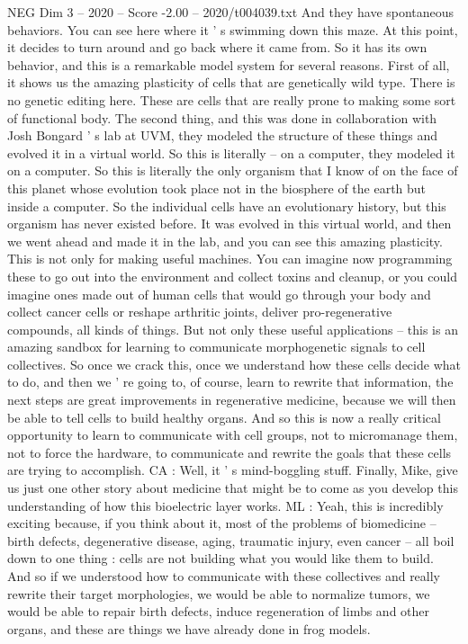 \begin{textsample}{NEG Dim 3 – 2020 – Score -2.00 – 2020/t004039.txt}
And they have spontaneous behaviors.
You can see here where it ' s swimming down this maze.
At this point, it decides to turn around and go back where it came from.
So it has its own behavior, and this is a remarkable model system for several reasons.
First of all, it shows us the amazing plasticity of cells that are genetically wild type.
There is no genetic editing here.
These are cells that are really prone to making some sort of functional body.
The second thing, and this was done in collaboration with Josh Bongard ' s lab at UVM, they modeled the structure of these things and evolved it in a virtual world.
So this is literally -- on a computer, they modeled it on a computer.
So this is literally the only organism that I know of on the face of this planet whose evolution took place not in the biosphere of the earth but inside a computer.
So the individual cells have an evolutionary history, but this organism has never existed before.
It was evolved in this virtual world, and then we went ahead and made it in the lab, and you can see this amazing plasticity.
This is not only for making useful machines.
You can imagine now programming these to go out into the environment and collect toxins and cleanup, or you could imagine ones made out of human cells that would go through your body and collect cancer cells or reshape arthritic joints, deliver pro-regenerative compounds, all kinds of things.
But not only these useful applications -- this is an amazing sandbox for learning to communicate morphogenetic signals to cell collectives.
So once we crack this, once we understand how these cells decide what to do, and then we ' re going to, of course, learn to rewrite that information, the next steps are great improvements in regenerative medicine, because we will then be able to tell cells to build healthy organs.
And so this is now a really critical opportunity to learn to communicate with cell groups, not to micromanage them, not to force the hardware, to communicate and rewrite the goals that these cells are trying to accomplish.
CA : Well, it ' s mind-boggling stuff.
Finally, Mike, give us just one other story about medicine that might be to come as you develop this understanding of how this bioelectric layer works.
ML : Yeah, this is incredibly exciting because, if you think about it, most of the problems of biomedicine -- birth defects, degenerative disease, aging, traumatic injury, even cancer -- all boil down to one thing : cells are not building what you would like them to build.
And so if we understood how to communicate with these collectives and really rewrite their target morphologies, we would be able to normalize tumors, we would be able to repair birth defects, induce regeneration of limbs and other organs, and these are things we have already done in frog models.

\end{textsample}

